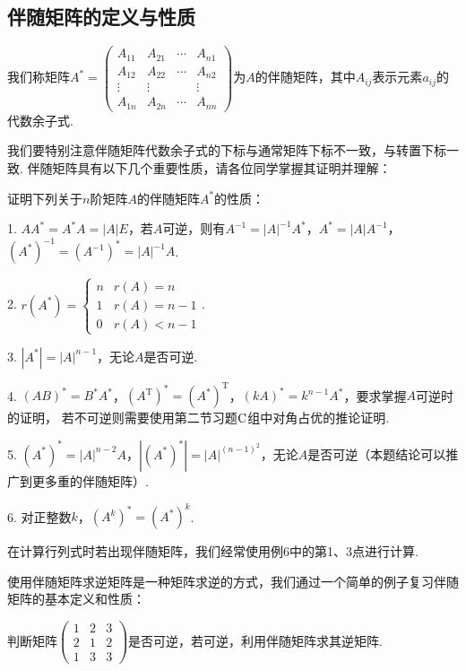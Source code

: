 \subsection{伴随矩阵的定义与性质}
\begin{definition}
	我们称矩阵$A^*=\begin{pmatrix}
		A_{11} & A_{21} & \cdots & A_{n1} \\
		A_{12} & A_{22} & \cdots & A_{n2} \\
		\vdots & \vdots &        & \vdots \\
		A_{1n} & A_{2n} & \cdots & A_{nn}
	\end{pmatrix}$为$A$的伴随矩阵，其中$A_{ij}$表示元素$a_{ij}$的代数余子式.
\end{definition}
我们要特别注意伴随矩阵代数余子式的下标与通常矩阵下标不一致，与转置下标一致.
伴随矩阵具有以下几个重要性质，请各位同学掌握其证明并理解：
\begin{example}
	证明下列关于$n$阶矩阵$A$的伴随矩阵$A^*$的性质：

	\textup{1}. $AA^*=A^*A=|A|E$，若$A$可逆，则有$A^{-1}=|A|^{-1}A^*$，$A^*=|A|A^{-1}$，$(A^*)^{-1}=(A^{-1})^*=|A|^{-1}A$.

	\textup{2}. $r(A^*)=\begin{cases}
		n & r(A)=n \\ 1 & r(A)=n-1 \\ 0 & r(A) < n-1
	\end{cases}$.

	\textup{3}. $|A^*|=|A|^{n-1}$，无论$A$是否可逆.

	\textup{4}. $(AB)^*=B^*A^*$，$(A^\mathrm{T})^*=(A^*)^\mathrm{T}$，$(kA)^*=k^{n-1}A^*$，要求掌握$A$可逆时的证明，
	若不可逆则需要使用第二节习题$\textup{C}$组中对角占优的推论证明.

	\textup{5}. $(A^*)^*=|A|^{n-2}A$，$|(A^*)^*|=|A|^{(n-1)^2}$，无论$A$是否可逆（本题结论可以推广到更多重的伴随矩阵）.

	\textup{6}. 对正整数$k$，$(A^k)^*=(A^*)^k$.
\end{example}
在计算行列式时若出现伴随矩阵，我们经常使用例6中的第1、3点进行计算.

使用伴随矩阵求逆矩阵是一种矩阵求逆的方式，我们通过一个简单的例子复习伴随矩阵的基本定义和性质：
\begin{example}
	判断矩阵$\begin{pmatrix}
		1 & 2 & 3 \\ 2 & 1 & 2 \\ 1 & 3 & 3
	\end{pmatrix}$是否可逆，若可逆，利用伴随矩阵求其逆矩阵.
\end{example}

